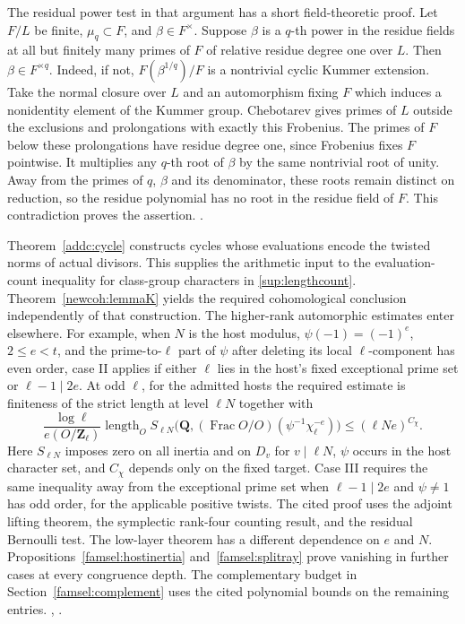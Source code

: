 The residual power test in that argument has a short field-theoretic
proof. Let \(F/L\) be finite, \(\mu_q\subset F\), and
\(\beta\in F^\times\). Suppose \(\beta\) is a \(q\)-th power in the
residue fields at all but finitely many primes of \(F\) of relative
residue degree one over \(L\). Then \(\beta\in F^{\times q}\).
Indeed, if not, \(F(\beta^{1/q})/F\) is a nontrivial cyclic Kummer
extension. Take the normal closure over \(L\) and an automorphism
fixing \(F\) which induces a nonidentity element of the Kummer
group. Chebotarev gives primes of \(L\) outside the exclusions and
prolongations with exactly this Frobenius. The primes of \(F\) below
these prolongations have residue degree one, since Frobenius fixes
\(F\) pointwise. It multiplies any \(q\)-th root of \(\beta\) by the
same nontrivial root of unity. Away from the primes of \(q\), \(\beta\)
and its denominator, these roots remain distinct on reduction, so
the residue polynomial has no root in the residue field of \(F\).
This contradiction proves the assertion.
.

Theorem~\ref{addc:cycle} constructs cycles whose evaluations encode
the twisted norms of actual divisors. This supplies the arithmetic
input to the evaluation-count inequality for class-group characters
in \eqref{sup:lengthcount}. Theorem~\ref{newcoh:lemmaK} yields the required cohomological
conclusion independently of that construction. The higher-rank
automorphic estimates enter elsewhere. For example, when \(N\) is
the host modulus, \(\psi(-1)=(-1)^e\), \(2\le e<t\), and the
prime-to-\(\ell\) part of \(\psi\) after deleting its local
\(\ell\)-component has even order, case II applies if either
\(\ell\) lies in the host's fixed exceptional prime set or
\(\ell-1\mid2e\). At odd \(\ell\), for the admitted hosts the
required estimate is finiteness of the strict length at level
\(\ell N\) together with
\[
 \frac{\log\ell}{e(O/\mathbf Z_\ell)}
 \operatorname{length}_O S_{\ell N}
   \big(\mathbf Q,(\operatorname{Frac}O/O)(\psi^{-1}\chi_\ell^{-e})\big)
 \le (\ell N e)^{C_\chi}.
\]
Here \(S_{\ell N}\) imposes zero on all inertia and on \(D_v\)
for \(v\mid\ell N\), \(\psi\) occurs in the host character set,
and \(C_\chi\) depends only on the fixed target. Case III requires the
same inequality away from the exceptional prime set when
\(\ell-1\mid2e\) and \(\psi\ne1\) has odd order, for the applicable
positive twists. The cited proof uses the adjoint lifting theorem,
the symplectic rank-four counting result, and the residual Bernoulli
test. The low-layer theorem has a different dependence on \(e\) and
\(N\). Propositions~\ref{famsel:hostinertia} and~\ref{famsel:splitray}
prove vanishing in further cases at every congruence depth. The
complementary budget in Section~\ref{famsel:complement} uses the
cited polynomial bounds on the remaining entries.
,
.

